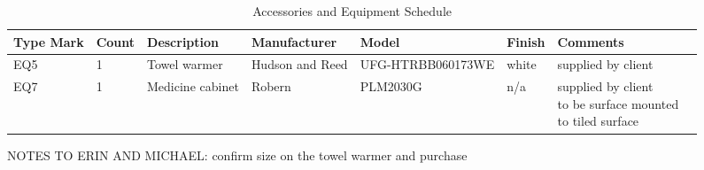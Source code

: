 \documentclass{article}
\begin{document}
\begin{sidewaystable}[h!]
\begin{center}

\caption{\large Accessories and Equipment Schedule}
\begin{tabular}{l|l|l|l|l|l|l|l}
\textbf{Type Mark} & \textbf{Count} & \textbf{Description} & \textbf{Manufacturer} & \textbf{Model} & \textbf{Finish} & \textbf{Comments} \\
\hline
\hline
EQ5   & 1  & Towel warmer & Hudson and Reed & UFG-HTRBB060173WE  & white & supplied by client \\ 
\hline
EQ7   & 1  & Medicine cabinet & Robern & PLM2030G & n/a &\makecell{supplied by client \\ to be surface mounted \\ to tiled surface} \\

\end{tabular}
\end{center}
\end{sidewaystable}

NOTES TO ERIN AND MICHAEL: confirm size on the towel warmer and purchase
\end{document}
